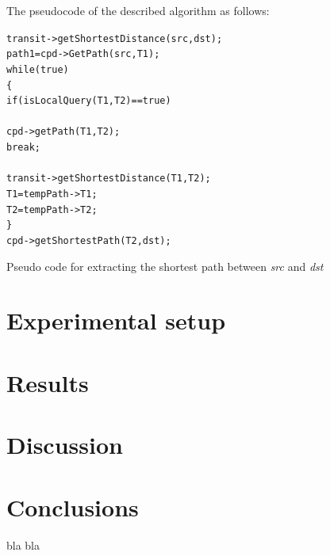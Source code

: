 \documentclass[runningheads,a4paper]{llncs}
\begin{document}
The pseudocode of the described algorithm as follows:
\begin{algorithm}
\begin{alltt}
   transit->getShortestDistance(src, dst);
   path1 = cpd->GetPath(src, T1);
   while (true)
   \{
      if (isLocalQuery(T1, T2) == true)
	  {
         cpd->getPath(T1, T2);
         break;
      }
      transit->getShortestDistance(T1, T2);
      T1 = tempPath->T1;
      T2 = tempPath->T2;
   \}
   cpd->getShortestPath(T2, dst);


\end{alltt}
\caption{Pseudo code for extracting the shortest path between \textit{src} and \textit{dst}} \label{alg:transit_cpd_pseudo}
\end{algorithm}

\section{Experimental setup}

\section{Results}

\section{Discussion}

\section{Conclusions}

bla bla~\cite{bast06}



\end{document}
